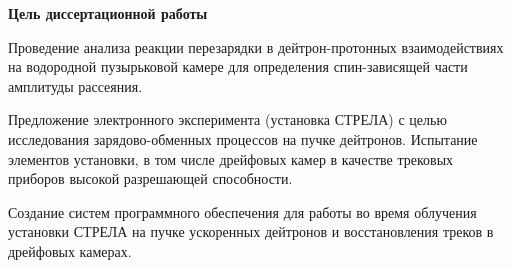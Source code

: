 \vspace{2ex}
\noindent \textbf{Цель диссертационной работы}
\begin{list}{}{\leftmargin=1.25em}
\item Проведение анализа реакции перезарядки \dpchex в дейтрон-протонных
  взаимодействиях на водородной пузырьковой камере для определения
  спин-зависящей части амплитуды \np рассеяния.
\item Предложение электронного эксперимента (установка СТРЕЛА) с целью
  исследования зарядово-обменных процессов на пучке дейтронов. Испытание
  элементов установки, в том числе дрейфовых камер в качестве трековых приборов
  высокой разрешающей способности.
\item Создание систем программного обеспечения для работы во время облучения
  установки СТРЕЛА на пучке ускоренных дейтронов и восстановления треков в
  дрейфовых камерах.
\end{list}

